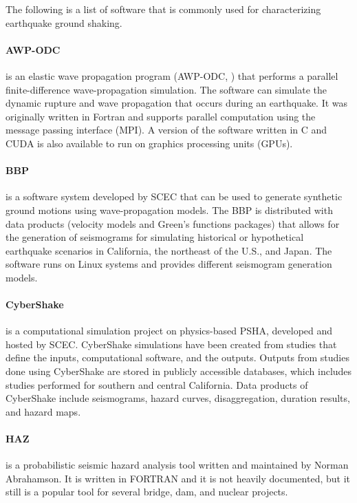 The following is a list of software that is commonly used for characterizing earthquake ground shaking.

\paragraph{AWP-ODC}  is an elastic wave propagation program (AWP-ODC, \cite{cui2010scalable}) that performs a parallel finite-difference wave-propagation simulation. The software can simulate the dynamic rupture and wave propagation that occurs during an earthquake. It was originally written in Fortran and supports parallel computation using the message passing interface (MPI). A version of the software written in C and CUDA is also available to run on graphics processing units (GPUs).

\paragraph{BBP}  \citep{maechling2015scec} is a software system developed by SCEC that can be used to generate synthetic ground motions using wave-propagation models. The BBP is distributed with data products (velocity models and Green's functions packages) that allows for the generation of seismograms for simulating historical or hypothetical earthquake scenarios in California, the northeast of the U.S., and Japan. The software runs on Linux systems and provides different seismogram generation models.

\paragraph{CyberShake}  is a computational simulation project on physics-based PSHA, developed and hosted by SCEC. CyberShake simulations have been created from studies that define the inputs, computational software, and the outputs. Outputs from studies done using CyberShake are stored in publicly accessible databases, which includes studies performed for southern and central California. Data products of CyberShake include seismograms, hazard curves, disaggregation, duration results, and hazard maps.

\paragraph{HAZ}  is a probabilistic seismic hazard analysis tool written and maintained by Norman Abrahamson. It is written in FORTRAN and it is not heavily documented, but it still is a popular tool for several bridge, dam, and nuclear projects.

